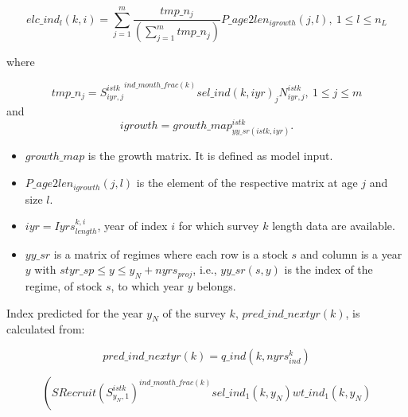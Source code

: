 \documentclass{article}
\begin{document}
\begin{equation}
    elc\_ind_l(k,i) = \sum_{j=1}^m\dfrac{tmp\_n_j}{\left(\displaystyle\sum_{j=1}^mtmp\_n_j\right)}P\_age2len_{igrowth}(j,l), \ 1\leq l \leq n_L
\end{equation}

where

\begin{equation}
    tmp\_n_j= {S^{istk}_{iyr,j}}^{ind\_month\_frac(k)}sel\_ind(k,iyr)_j N^{istk}_{iyr,j}, \ 1\leq j \leq m
\end{equation}
and
\begin{equation}
    igrowth=growth\_map^{istk}_{yy\_sr(istk,iyr)}.    
\end{equation}

\begin{itemize}

    \item $growth\_map$ is the growth matrix. It is defined as model input. %
    
    \item $P\_age2len_{igrowth}(j,l)$ is the element of the respective matrix at age $j$ and size $l$.
    
    \item $iyr=Iyrs^{k,i}_{length}$, year of index $i$ for which survey $k$ length data are available.
    
    \item $yy\_sr$ is a matrix of regimes where each row is a stock $s$ and column is a year $y$ with $styr\_sp \leq y \leq y_N + nyrs_{proj}$, i.e., $yy\_sr(s,y)$ is the index of the regime, of stock $s$, to which year $y$ belongs.   
    
\end{itemize}
    
Index predicted for the year $y_N$ of the survey $k$, $pred\_ind\_nextyr(k)$, is calculated from:

\begin{equation}
    pred\_ind\_nextyr(k)=q\_ind(k,nyrs^k_{ind}) 
\end{equation}

\begin{equation*}
    \left( SRecruit {\left(S^{istk}_{y_N,1}\right)}^{ind\_month\_frac(k)} sel\_ind_1(k,y_N)  wt\_ind_1(k,y_N)\right.
\end{equation*}
\end{document}
